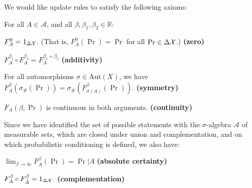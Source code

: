 \documentclass{article}
\begin{document}
We would like update rules to satisfy the following axioms:

For all $A \in \mathcal A$, and all $\beta,\beta_1, \beta_2 \in \mathbb R$:
\begin{URaxioms}
    \item  $F^{0}_A  = {1}_{\Delta\mathcal X}$. (That is, $F^{0}_A(\Pr) = \Pr$ for all $\Pr \in \Delta\mathcal X$.)
        \hfill \textbf{(zero)} \label{ax:zero}
    \item $F^{\beta_1}_A \circ F^{\beta_2}_A = F^{\beta_1 + \beta_2}_A$
        \hfill \textbf{(additivity)} \label{ax:additivity}
    \item For all automorphisms $\sigma \in \mathrm{Aut}(X)$, we have \\
        $F^\beta_A(\sigma_\#(\Pr)) = \sigma_\#(F^\beta_{\sigma(A)}(\Pr))$.
        \hfill \textbf{(symmetry)} \label{ax:symmetry}
    \item $F_A(\beta, \Pr)$ is continuous in both arguments.
        \hfill \textbf{(continuity)} \label{ax:continuity}
\end{URaxioms}


Since we have identified the set of possible statements with the $\sigma$-algebra $\mathcal A$ of measurable sets, which are closed under union and complementation, and on which probabilistic conditioning is defined, we also have:

\begin{URaxioms}
    \item $\displaystyle \lim_{\beta\to\infty} F^\beta_A (\Pr) = \Pr|A$
    \hfill \textbf{(absolute certainty)} \label{ax:certainty}


    \item
    $F^\beta_A \circ F_{\bar A}^\beta = 1_{\Delta\mathcal X}$.
        \hfill \textbf{(complementation)} \label{ax:comp}
\end{URaxioms}
\end{document}
